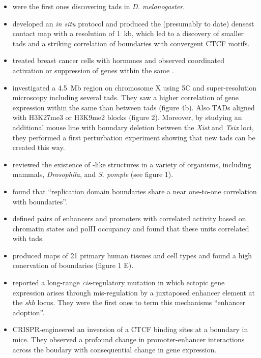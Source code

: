 \begin{itemize}
\item \cite{Sexton2012} were the first ones discovering \acp{tad} in \textit{D.
    melanogaster}.
\item \cite{Rao2014a} developed an \textit{in situ} \hic protocol and produced
    the (presumably to date) densest \hic contact map
    with a resolution of 1~kb, which led to a discovery of smaller \acp{tad} and
    a striking correlation of \tad boundaries with convergent CTCF motifs.
\item \cite{LeDily2014} treated breast cancer cells with hormones and observed
    coordinated activation or suppression of genes within the same \tad.
\item \cite{Nora2012} investigated a 4.5~Mb region on chromosome X using 5C and
    super-resolution microscopy including several \acp{tad}. They saw a higher
    correlation of gene expression within the same \tad than between \acp{tad}
    (figure 4b). Also TADs aligned with H3K27me3 or H3K9me2 blocks (figure 2).
    Moreover, by studying an additional mouse line with \tad boundary deletion
    between the \textit{Xist} and \textit{Tsix} loci, they performed a first
    perturbation experiment showing that new \acp{tad} can be created this way.
\item \cite{Dekker2015} reviewed the existence of \tad-like structures in a
    variety of organisms, including mammals, \textit{Drosophila}, and
    \textit{S. pomple} (see figure 1).
\item \cite{Pope2014} found that ``replication domain boundaries share a near
    one-to-one correlation with \tad boundaries''.
\item \cite{Shen2012} defined pairs of enhancers and promoters with correlated
    activity based on chromatin states and polII occupancy and found that these
    units correlated with \acp{tad}.
\item \cite{Schmitt2016} produced \hic maps of 21 primary human tissues and cell
    types and found a high conervation of \tad boundaries (figure 1 E).
\item \cite{Lettice2011} reported  a long-range \textit{cis}-regulatory mutation
    in which ectopic gene expression arises through mis-regulation by a
    juxtaposed enhancer element at the \textit{shh} locus. They were the first
    ones to term this mechanisms ``enhancer adoption''.
\item \cite{Guo2015} CRISPR-engineered an inversion of a CTCF binding sites at
    a \tad boundary in mice. They observed a profound change in promoter-enhancer
    interactions across the boudary with consequential change in gene
    expression.
\end{itemize}






